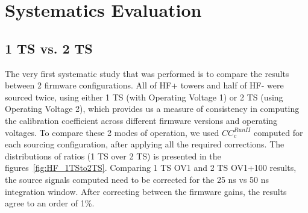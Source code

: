 \section{Systematics Evaluation}
\subsection{1 TS vs. 2 TS}
The very first systematic study that was performed is to compare the results between 2
firmware configurations. All of HF+ towers and half of HF- were sourced twice,
using either 1 TS (with Operating Voltage 1) or 2 TS (using Operating Voltage 2),
which provides us a measure of consistency in computing the calibration
coefficient across different firmware versions and operating voltages.
To compare these 2 modes of operation, we used ${CC}^{Run II}_{c}$ computed for
each sourcing configuration, after applying all the required corrections. The
distributions of ratios (1 TS over 2 TS) is presented in the figures~\ref{fig:HF_1TSto2TS}. Comparing 1 TS OV1 and 2 TS OV1+100 results, the source signals computed need to be corrected for the 25 ns vs 50 ns integration window. After correcting between the firmware gains, the results agree to an order of 1\%.

